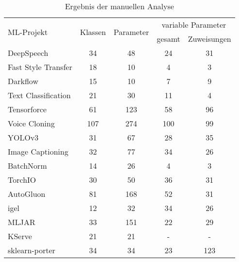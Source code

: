 \documentclass[german,bachelor]{swsLeipzig}
\begin{document}
\begin{table}[H]
\small
\begin{center}
\setlength{\tabcolsep}{5pt}
\begin{tabular}[h]{l|c|c|c|c} %
\hline
\multirow{2}{*}{ML-Projekt} & \multirow{2}{*}{Klassen}   & \multirow{2}{*}{Parameter} &   \multicolumn{2}{c}{variable Parameter}\\
                            &           &           &   gesamt   &   Zuweisungen \\
\hline \hline
DeepSpeech                  & 34        & 48        & 24            & 31\\
Fast Style Transfer         & 18        & 10        & 4             & 3\\
Darkflow                    & 15        & 10        & 7             & 9\\
Text Classification         & 21        & 30        & 11            & 4\\
Tensorforce                 & 61        & 123       & 58            & 96\\
\hline
Voice Cloning               & 107       & 274       & 100           & 99\\
YOLOv3                      & 31        & 67        & 28            & 35\\
Image Captioning            & 32        & 77        & 34            & 26\\
BatchNorm                   & 14        & 26        & 4             & 3\\
TorchIO                     & 30        & 50        & 36            & 31\\
\hline
AutoGluon                   & 81        & 168        & 52            & 31\\
igel                        & 12        & 32         & 34            & 26\\
MLJAR                       & 33        & 151       & 22            & 29\\
KServe                      & 21        & 21        & -             & -\\
sklearn-porter              & 34        & 34        & 23            & 123\\
\hline
\end{tabular}
\caption{Ergebnis der manuellen Analyse} \label{manuell}
\end{center}
\end{table}
\end{document}
